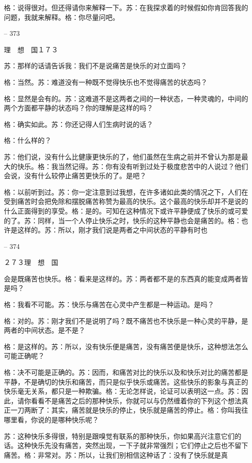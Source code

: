 \documentclass[11pt,oneside]{book}
\begin{document}
\begin{common-format}
    格：说得很对。但还得请你来解释一下。苏：在我探求着的时候假如你肯回答我的问题，我就来解释。格：你尽量问吧。

    

-- 373

    理　想　国１７３

    苏：那样的话请告诉我：我们不是说痛苦是快乐的对立面吗？

    格：当然。苏：难道没有一种既不觉得快乐也不觉得痛苦的状态吗？

    格：显然是会有的。苏：这难道不是这两者之间的一种状态，一种灵魂的，中间的两个方面都平静的状态吗？你的理解是这样的吗？

    格：确实如此。苏：你还记得人们生病时说的话？

    格：什么样的？

    苏：他们说，没有什么比健康更快乐的了，他们虽然在生病之前并不曾认为那是最大的快乐。格：我当然记得。苏：你有没有听到过处于极度悲苦中的人说过？他们会说，没有什么较停止痛苦更快乐的了。是吧？

    格：以前听到过。苏：你一定注意到过我想，在许多诸如此类的情况之下，人们在受到痛苦时会把免除和摆脱痛苦称赞为最高的快乐。这个最高的快乐却并不是说的什么正面得到的享受。格：是的。可知在这种情况下或许平静便成了快乐的或可爱的了。苏：同样，当一个人停止快乐之时，快乐的这种平静也会是痛苦的。格：也许是这样的。苏：所以，刚才我们说是两者之中间状态的平静有时也

    

-- 374

    ２７３理　想　国

    会是既痛苦也快乐。格：看来是这样的。苏：两者都不是的东西真的能变成两者皆是吗？

    格：我看不可能。苏：快乐与痛苦在心灵中产生都是一种运动。是吗？

    格：对的。苏：刚才我们不是说明了吗？既不痛苦也不快乐是一种心灵的平静，是两者的中间状态。是不是？

    格：是这样的。苏：所以，没有快乐便是痛苦，没有痛苦便是快乐，这种想法怎么可能正确呢？

    格：决不可能是正确的。苏：因而，和痛苦对比的快乐以及和快乐对比的痛苦都是平静，不是确切的快乐和痛苦，而只是似乎快乐或痛苦。这些快乐的影象与真正的快乐毫无关系，都只是一种欺骗。格：无论怎样说，论证可以表明这一点。苏：因此，请你看看不是痛苦之后的那种快乐，你就可以与仍然缠着你的下列这个想法真正一刀两断了：其实，痛苦就是快乐的停止，快乐就是痛苦的停止。格：你叫我往哪里看，你说的是哪种快乐呢？

    苏：这种快乐多得很，特别是跟嗅觉有联系的那种快乐，你如果高兴注意它们的话。这种快乐先没有痛苦，突然出现，一下子就非常强烈；它们停止之后也不留下痛苦。格：非常对。苏：所以，让我们别相信这种话了：没有了快乐就是真


\end{common-format}
\end{document}

